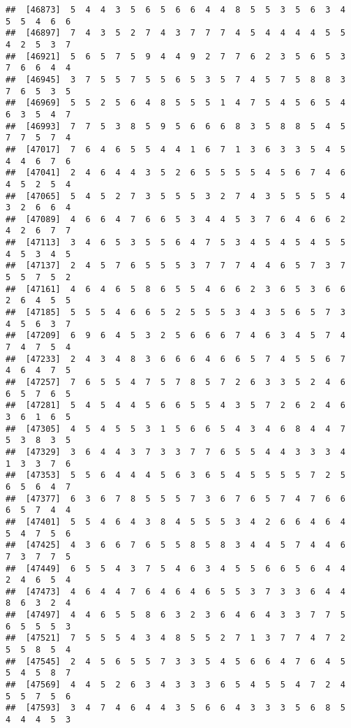 \documentclass[
]{book}
\begin{document}
\begin{verbatim}
##  [46873]  5  4  4  3  5  6  5  6  6  4  4  8  5  5  3  5  6  3  4  5  5  4  6  6
##  [46897]  7  4  3  5  2  7  4  3  7  7  7  4  5  4  4  4  4  5  5  4  2  5  3  7
##  [46921]  5  6  5  7  5  9  4  4  9  2  7  7  6  2  3  5  6  5  3  7  6  6  4  4
##  [46945]  3  7  5  5  7  5  5  6  5  3  5  7  4  5  7  5  8  8  3  7  6  5  3  5
##  [46969]  5  5  2  5  6  4  8  5  5  5  1  4  7  5  4  5  6  5  4  6  3  5  4  7
##  [46993]  7  7  5  3  8  5  9  5  6  6  6  8  3  5  8  8  5  4  5  7  7  5  7  4
##  [47017]  7  6  4  6  5  5  4  4  1  6  7  1  3  6  3  3  5  4  5  4  4  6  7  6
##  [47041]  2  4  6  4  4  3  5  2  6  5  5  5  5  4  5  6  7  4  6  4  5  2  5  4
##  [47065]  5  4  5  2  7  3  5  5  5  3  2  7  4  3  5  5  5  5  4  3  2  6  6  4
##  [47089]  4  6  6  4  7  6  6  5  3  4  4  5  3  7  6  4  6  6  2  4  2  6  7  7
##  [47113]  3  4  6  5  3  5  5  6  4  7  5  3  4  5  4  5  4  5  5  4  5  3  4  5
##  [47137]  2  4  5  7  6  5  5  5  3  7  7  7  4  4  6  5  7  3  7  5  5  7  5  2
##  [47161]  4  6  4  6  5  8  6  5  5  4  6  6  2  3  6  5  3  6  6  2  6  4  5  5
##  [47185]  5  5  5  4  6  6  5  2  5  5  5  3  4  3  5  6  5  7  3  4  5  6  3  7
##  [47209]  6  9  6  4  5  3  2  5  6  6  6  7  4  6  3  4  5  7  4  7  4  7  5  4
##  [47233]  2  4  3  4  8  3  6  6  6  4  6  6  5  7  4  5  5  6  7  4  6  4  7  5
##  [47257]  7  6  5  5  4  7  5  7  8  5  7  2  6  3  3  5  2  4  6  6  5  7  6  5
##  [47281]  5  4  5  4  4  5  6  6  5  5  4  3  5  7  2  6  2  4  6  3  6  1  6  5
##  [47305]  4  5  4  5  5  3  1  5  6  6  5  4  3  4  6  8  4  4  7  5  3  8  3  5
##  [47329]  3  6  4  4  3  7  3  3  7  7  6  5  5  4  4  3  3  3  4  1  3  3  7  6
##  [47353]  5  5  6  4  4  4  5  6  3  6  5  4  5  5  5  5  7  2  5  6  5  6  4  7
##  [47377]  6  3  6  7  8  5  5  5  7  3  6  7  6  5  7  4  7  6  6  6  5  7  4  4
##  [47401]  5  5  4  6  4  3  8  4  5  5  5  3  4  2  6  6  4  6  4  5  4  7  5  6
##  [47425]  4  3  6  6  7  6  5  5  8  5  8  3  4  4  5  7  4  4  6  7  3  7  7  5
##  [47449]  6  5  5  4  3  7  5  4  6  3  4  5  5  6  6  5  6  4  4  2  4  6  5  4
##  [47473]  4  6  4  4  7  6  4  6  4  6  5  5  3  7  3  3  6  4  4  8  6  3  2  4
##  [47497]  4  4  6  5  5  8  6  3  2  3  6  4  6  4  3  3  7  7  5  6  5  5  5  3
##  [47521]  7  5  5  5  4  3  4  8  5  5  2  7  1  3  7  7  4  7  2  5  5  8  5  4
##  [47545]  2  4  5  6  5  5  7  3  3  5  4  5  6  6  4  7  6  4  5  5  4  5  8  7
##  [47569]  4  4  5  2  6  3  4  3  3  3  6  5  4  5  5  4  7  2  4  5  5  7  5  6
##  [47593]  3  4  7  4  6  4  4  3  5  6  6  4  3  3  3  5  6  8  5  4  4  4  5  3

\end{verbatim}
\end{document}
